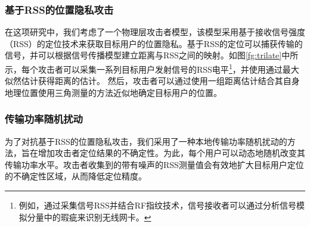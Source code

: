 \subsubsection{基于RSS的位置隐私攻击}
在这项研究中，我们考虑了一个物理层攻击者模型，该模型采用基于接收信号强度（RSS）的定位技术来获取目标用户的位置隐私。基于RSS的定位可以捕获传输的信号，并可以根据信号传播模型\cite{Jiang07,EI10}建立距离与RSS之间的映射。如图\ref{fg:trilate}中所示，每个攻击者可以采集一系列目标用户发射信号的RSS电平\footnote{例如，通过采集信号RSS并结合RF指纹技术\cite{TIEYuanchao}，信号接收者可以通过分析信号模拟分量中的瑕疵来识别无线网卡。}，并使用通过最大似然估计\cite{RSSguang}获得距离的估计。
然后，攻击者可以通过使用一组距离估计结合其自身地理位置使用三角测量的方法近似地确定目标用户的位置。


\subsubsection{传输功率随机扰动}
为了对抗基于RSS的位置隐私攻击，我们采用了一种本地传输功率随机扰动的方法，旨在增加攻击者定位结果的不确定性\cite{EI10}。为此，每个用户可以动态地随机改变其传输功率水平。攻击者收集到的带有噪声的RSS测量值会有效地扩大目标用户定位的不确定性区域，从而降低定位精度。

